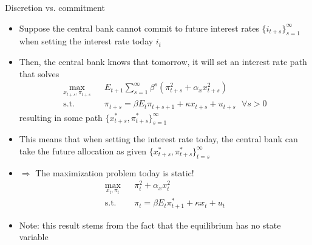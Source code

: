 \documentclass[9pt,xcolor={dvipsnames}]{beamer}
\newcommand{\bit}{\begin{itemize}}
\newcommand{\eit}{\end{itemize}}
\begin{document}
\begin{frame}{Discretion vs. commitment}

\bit
\setlength\itemsep{1em}
\item Suppose the central bank cannot commit to future interest rates $\{i_{t+s}\}_{s=1}^{\infty}$ when setting the interest rate today $i_t$

\item Then, the central bank knows that tomorrow, it will set an interest rate path that solves
\begin{eqnarray}
\max_{x_{t+s}, \pi_{t+s}} && E_{t+1} \sum_{s=1}^{\infty} \beta^s (\pi_{t+s}^2 + \alpha_x x_{t+s}^2) \nonumber \\
\text{s.t. } &&  \pi_{t+s} = \beta E_t \pi_{t+s+1} + \kappa x_{t+s} + u_{t+s} \text{  } \forall s>0 \nonumber 
\end{eqnarray}
resulting in some path $\{x^*_{t+s}, \pi^*_{t+s}\}_{s=1}^{\infty}$

\item This means that when setting the interest rate today, the central bank can take the future allocation as given $\{x^*_{t+s}, \pi^*_{t+s}\}_{t=s}^{\infty}$

\item $\Rightarrow$ The maximization problem today is static!
\begin{eqnarray}
\max_{x_t, \pi_t} && \pi_t^2 + \alpha_x x_t^2 \nonumber \\
\text{s.t. } &&  \pi_t = \beta E_t \pi^*_{t+1} + \kappa x_t + u_t \nonumber 
\end{eqnarray}

\item Note: this result stems from the fact that the equilibrium has no state variable

\eit

\end{frame}
\end{document}
